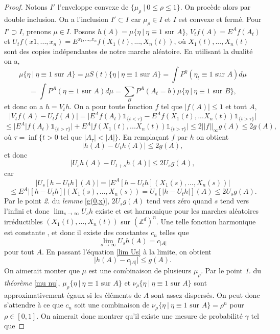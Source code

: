 \documentclass[a4paper,11pt]{article}
\theoremstyle{break}
\theoremstyle{break}
\theoremstyle{definition}
\theoremstyle{remark}
\begin{document}
\begin{proof}
Notons $I'$ l'enveloppe convexe de $\{\mu_\rho \ \vert \ 0\leq\rho \leq 1\}$. On procède alors par double inclusion. On a l'inclusion $I'\subset I$ car $\mu_\rho\in I$ et $I$ est convexe et fermé. Pour $I'\supset I$, prenons $\mu\in I$. Posons $h(A)=\mu\{\eta \ \vert \ \eta \equiv 1 \text{ sur }A\}$, $V_t f(A) = E^A f(A_t)$ et $U_t f(x1,...,x_n) = E^{x_1,...,x_n} f(X_1(t),...,X_n(t))$, où $X_1(t),...,X_n(t)$ sont des copies indépendantes de notre marche aléatoire. En utilisant la dualité on a,
$$
\mu\{\eta \ \vert \ \eta \equiv 1 \text{ sur }A\} =\mu S(t)\{\eta \ \vert \ \eta \equiv 1 \text{ sur } A\} = \int P^\eta (\eta_t \equiv 1 \text{ sur } A ) d\mu 
$$
$$
= \int P^A (\eta \equiv 1 \text{ sur } A) d\mu = \sum\limits_B P^A(A_t =b)\mu\{\eta \ \vert \ \eta \equiv 1 \text{ sur }B\},
$$
et donc on a $h=V_t h$. On a pour toute fonction $f$ tel que $\vert f(A)\vert\leq 1$ et tout $A$,
$$
\vert V_t f(A)-U_t f(A)\vert = \vert E^Af(A_t)\mathds{1}_{\{t<\tau\}}-E^A f(X_1(t),...X_n(t))\mathds{1}_{\{t>\tau\}}\vert
$$
$$
\leq \vert E^A\vert f(A_t)\mathds{1}_{\{t>\tau\}}\vert +E^A\vert f(X_1(t),...X_n(t))\mathds{1}_{\{t>\tau\}}\vert \leq 2 \vert\vert  f\vert\vert_\infty  g(A) \leq 2 g(A),
$$
où $\tau=\inf\{ t>0 \text{ tel que } \vert A_\tau \vert < \vert A\vert\}$. En remplaçant $f$ par $h$ on obtient
\begin{equation}\label{lim Us}
\vert h(A) - U_t h(A)\vert \leq 2 g(A),
\end{equation}
et donc
$$
\vert U_s h(A)-U_{t+s} h(A)\vert \leq 2 U_s g(A),
$$
car
$$
\vert U_s [h-U_t h](A)\vert =\vert E^A[h-U_t h] (X_1(s),...,X_n(s))\vert 
$$
$$
\leq E^A \vert [h-U_th]\vert (X_1(s),...,X_n (s))= U_s [ \vert h-U_t h \vert ] (A) \leq 2 U_s g(A).
$$%
Par le point \textit{2.} du \textit{lemme} \ref{g(0,x)},  $2 U_sg(A)$ tend vers zéro quand $s$ tend vers l'infini et donc $\lim_{s\rightarrow\infty} U_s h$ existe et est harmonique pour les marches aléatoires irréductibles $(X_1(t),...,X_n(t))$ sur $(\mathbb{Z}^d)^n$. Une telle fonction harmonique est constante \cite{Liggettpdf}, et donc il existe des constantes $c_n$ telles que
$$
\lim_{s\rightarrow\infty} U_s h(A) = c_{\vert A\vert }
$$
pour tout $A$. En passant l'équation \eqref{lim Us} à la limite, on obtient
\begin{equation}\label{ca}
\vert h(A)-c_{\vert A\vert}\vert \leq g(A).
\end{equation}
On aimerait monter que $\mu$ est une combinaison de plusieurs $\mu_\rho$. Par le point \textit{1.} du \textit{théorème} \ref{mu nu}, $ \mu_\rho \{\eta \ \vert \ \eta \equiv 1 \text{ sur } A\}$ et $ \nu_\rho \{\eta \ \vert \ \eta \equiv 1 \text{ sur } A\}$ sont approximativement égaux si les éléments de $A$ sont assez dispersés. On peut donc s'attendre à ce que $c_n$ soit une combinaison de $ \nu_\rho \{\eta \ \vert \ \eta \equiv 1 \text{ sur } A\}=\rho^n$ pour $\rho\in [0,1]$. On aimerait donc montrer qu'il existe une mesure de probabilité $\gamma$ tel que 

\end{proof}
\end{document}
